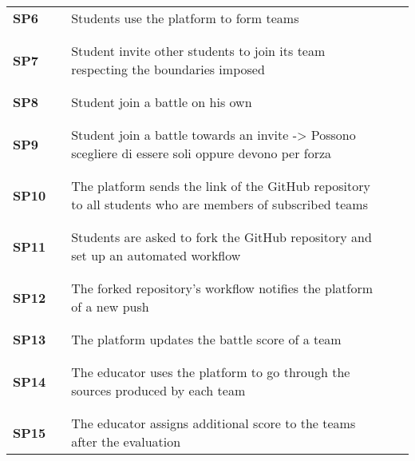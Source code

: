 \begin{longtable}[H]{l l p{8.5cm} l l}
        \textbf{SP6}  & \vline & Students use the platform to form teams & \vline & \\
                      & & & & \\\hline & & & & \\
        \textbf{SP7}  & \vline & Student invite other students to join its team respecting the boundaries imposed & \vline & \\
                      & & & & \\\hline & & & & \\
        \textbf{SP8}  & \vline & Student join a battle on his own & \vline & \\
                      & & & & \\\hline & & & & \\
        \textbf{SP9}  & \vline & Student join a battle towards an invite -> Possono scegliere di essere soli oppure devono per forza & \vline & \\
                      & & & & \\\hline & & & & \\
        \textbf{SP10} & \vline & The platform sends the link of the GitHub repository to all students who are members of subscribed teams & \vline & \\
                      & & & & \\\hline & & & & \\
        \textbf{SP11} & \vline & Students are asked to fork the GitHub repository and set up an automated workflow & \vline & \\
                      & & & & \\\hline & & & & \\
        \textbf{SP12} & \vline & The forked repository's workflow notifies the platform of a new push & \vline & \\
                      & & & & \\\hline & & & & \\
        \textbf{SP13} & \vline & The platform updates the battle score of a team & \vline & \\
                      & & & & \\\hline & & & & \\
        \textbf{SP14} & \vline & The educator uses the platform to go through the sources produced by each team & \vline & \\
                      & & & & \\\hline & & & & \\
        \textbf{SP15} & \vline & The educator assigns additional score to the teams after the evaluation & \vline & \\

\end{longtable}
